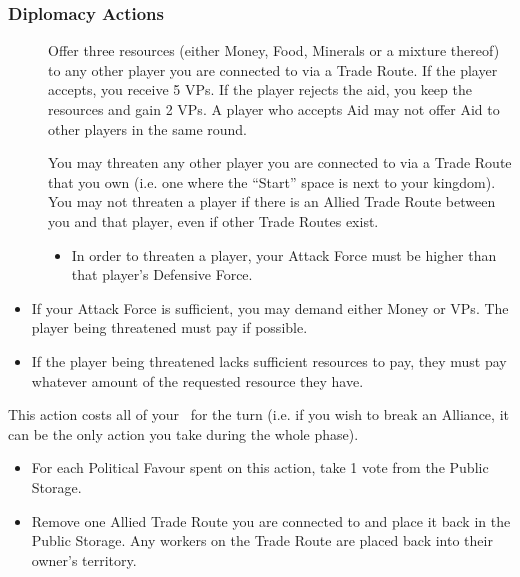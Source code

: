 \documentclass[10pt,twocolumn]{article}
\begin{document}
\subsubsection{Diplomacy Actions}
\begin{description}
\item[] Offer three resources (either Money, Food, Minerals or a mixture thereof) to any other player you are connected to via a Trade Route. If the player accepts, you receive 5 VPs. If the player rejects the aid, you keep the resources and gain 2 VPs. A player who accepts Aid may not offer Aid to other players in the same round.
\item[] You may threaten any other player you are connected to via a Trade Route that you own (i.e. one where the ``Start'' space is next to your kingdom). You may not threaten a player if there is an Allied Trade Route between you and that player, even if other Trade Routes exist.
\begin{itemize}
\item In order to threaten a player, your Attack Force must be higher than that player's Defensive Force.
\end{itemize}
\end{description}
\begin{description}
\begin{itemize}
\item If your Attack Force is sufficient, you may demand either  Money or  VPs. The player being threatened must pay if possible.
\item If the player being threatened lacks sufficient resources to pay, they must pay whatever amount of the requested resource they have.
\end{itemize}

\item[\actionCost{Break Alliance}{All}] This action costs all of your \polf\ for the turn (i.e. if you wish to break an Alliance, it can be the only action you take during the whole  phase).
\begin{itemize}
\item For each Political Favour spent on this action, take 1 vote from the Public Storage.
\item Remove one Allied Trade Route you are connected to and place it back in the Public Storage. Any workers on the Trade Route are placed back into their owner's territory.
\end{itemize}
\end{description}
\end{document}

